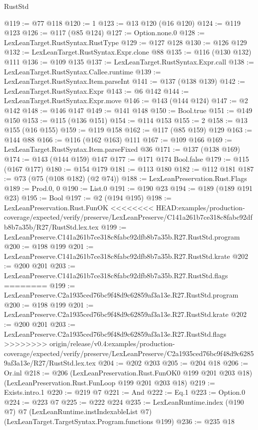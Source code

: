 \begin{lexlean}{RustStd}
\begin{coremodule}
{\begin{coremodule}
{{{{{@119 := @77 @118
@120 := 1
@123 := @13 @120 (@16 @120)
@124 := @119 @123
@126 := @117 (@85 @124)
@127 := Option.none.{0}
@128 := LexLeanTarget.RustSyntax.RustType
@129 := @127 @128
@130 := @126 @129
@132 := LexLeanTarget.RustSyntax.Expr.clone @88
@135 := @116 (@130 @132) @111
@136 := @109 @135
@137 := LexLeanTarget.RustSyntax.Expr.call
@138 := LexLeanTarget.RustSyntax.Callee.runtime
@139 := LexLeanTarget.RustSyntax.Item.parseInt
@141 := @137 (@138 @139)
@142 := LexLeanTarget.RustSyntax.Expr
@143 := @6 @142
@144 := LexLeanTarget.RustSyntax.Expr.move
@146 := @143 (@144 @124)
@147 := @2 @142
@148 := @146 @147
@149 := @141 @148
@150 := Bool.true
@151 := @149 @150
@153 := @115 (@136 @151)
@154 := @114 @153
@155 := 2
@158 := @13 @155 (@16 @155)
@159 := @119 @158
@162 := @117 (@85 @159) @129
@163 := @144 @88
@166 := @116 (@162 @163) @111
@167 := @109 @166
@169 := LexLeanTarget.RustSyntax.Item.parseFixed @36
@171 := @137 (@138 @169)
@174 := @143 (@144 @159) @147
@177 := @171 @174 Bool.false
@179 := @115 (@167 @177)
@180 := @154 @179
@181 := @113 @180
@182 := @112 @181
@187 := @73 (@75 (@108 @182) (@2 @74))
@188 := LexLeanPreservation.Rust.Flags
@189 := Prod.{0, 0}
@190 := List.{0}
@191 := @190 @23
@194 := @189 (@189 @191 @23)
@195 := Bool
@197 := @2 (@194 @195)
@198 := LexLeanPreservation.Rust.FunOK
<<<<<<<< HEAD:examples/production-coverage/expected/verify/preserve/LexLeanPreserve/C141a261b7ce318c8fabc92dfb8b7a35b/R27/RustStd.lex.tex
@199 := LexLeanPreserve.C141a261b7ce318c8fabc92dfb8b7a35b.R27.RustStd.program
@200 := @198 @199
@201 := LexLeanPreserve.C141a261b7ce318c8fabc92dfb8b7a35b.R27.RustStd.krate
@202 := @200 @201
@203 := LexLeanPreserve.C141a261b7ce318c8fabc92dfb8b7a35b.R27.RustStd.flags
========
@199 := LexLeanPreserve.C2a1935ced76bc9f48d9c62859af3a13e.R27.RustStd.program
@200 := @198 @199
@201 := LexLeanPreserve.C2a1935ced76bc9f48d9c62859af3a13e.R27.RustStd.krate
@202 := @200 @201
@203 := LexLeanPreserve.C2a1935ced76bc9f48d9c62859af3a13e.R27.RustStd.flags
>>>>>>>> origin/release/v0.4:examples/production-coverage/expected/verify/preserve/LexLeanPreserve/C2a1935ced76bc9f48d9c62859af3a13e/R27/RustStd.lex.tex
@204 := @202 @203
@205 := @204 @18
@206 := Or.inl
@218 := @206
    (LexLeanPreservation.Rust.FunOK0 @199 @201 @203 @18)
    (LexLeanPreservation.Rust.FunLoop @199 @201 @203 @18)
@219 := Exists.intro.{1}
@220 := @219 @7
@221 := And
@222 := Eq.{1}
@223 := Option.{0}
@224 := @223 @7
@225 := @222 @224
@235 := LexLeanRuntime.index
    (@190 @7)
    @7
    (LexLeanRuntime.instIndexableList @7)
    (LexLeanTarget.TargetSyntax.Program.functions @199)
@236 := @235 @18
}}}}}
\end{coremodule}}
\end{coremodule}
\end{lexlean}

